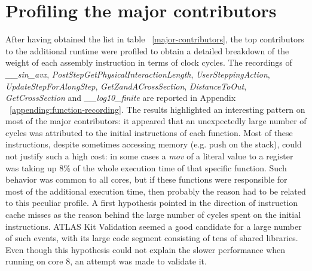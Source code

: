 \documentclass[a4paper]{jpconf}
\begin{document}
\section{Profiling the major contributors}
After having obtained the list in table ~\ref{major-contributors}, the 
top contributors to the additional runtime were profiled to obtain
a detailed breakdown of the weight of each assembly instruction in terms of 
clock cycles. The recordings of \textit{\_\_sin\_avx}, 
\textit{PostStepGetPhysicalInteractionLength}, \textit{UserSteppingAction},
\textit{UpdateStepForAlongStep}, \textit{GetZandACrossSection},
\textit{DistanceToOut}, \textit{GetCrossSection} and \textit{\_\_log10\_finite}
 are reported in Appendix  
~\ref{appending:function-recording}. The results highlighted an interesting 
pattern on most of the major contributors:  it appeared that an unexpectedly 
large number of cycles was attributed to the initial instructions of each function.
Most of these instructions, despite sometimes accessing memory 
(e.g. push on the stack), could not justify such a high cost: in some cases a 
\textit{mov} of a literal value to a register was taking up 8\% of the whole 
execution time of that specific function. Such behavior was common to all cores,
but if these functions were responsible for most of the additional execution time,
then probably the reason had to be related to this peculiar profile. A first hypothesis
pointed in the direction of instruction cache misses as the reason behind
the large number of cycles spent on the initial instructions.
ATLAS Kit Validation seemed a good candidate for a large number of  such events,
with its large code segment consisting of tens of shared libraries. Even though
this hypothesis could not explain the slower performance when running on core 8,
an attempt was made to validate it.
 
\end{document}

